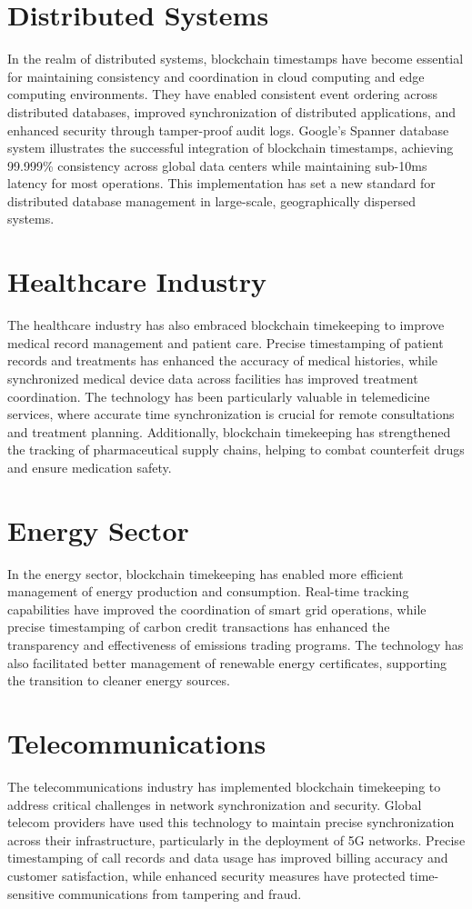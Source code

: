 \documentclass[12pt]{report}
\begin{document}
\section{Distributed Systems}
In the realm of distributed systems, blockchain timestamps have become essential for maintaining consistency and coordination in cloud computing and edge computing environments. They have enabled consistent event ordering across distributed databases, improved synchronization of distributed applications, and enhanced security through tamper-proof audit logs. Google's Spanner database system illustrates the successful integration of blockchain timestamps, achieving 99.999\% consistency across global data centers while maintaining sub-10ms latency for most operations. This implementation has set a new standard for distributed database management in large-scale, geographically dispersed systems.

\section{Healthcare Industry}
The healthcare industry has also embraced blockchain timekeeping to improve medical record management and patient care. Precise timestamping of patient records and treatments has enhanced the accuracy of medical histories, while synchronized medical device data across facilities has improved treatment coordination. The technology has been particularly valuable in telemedicine services, where accurate time synchronization is crucial for remote consultations and treatment planning. Additionally, blockchain timekeeping has strengthened the tracking of pharmaceutical supply chains, helping to combat counterfeit drugs and ensure medication safety.

\section{Energy Sector}
In the energy sector, blockchain timekeeping has enabled more efficient management of energy production and consumption. Real-time tracking capabilities have improved the coordination of smart grid operations, while precise timestamping of carbon credit transactions has enhanced the transparency and effectiveness of emissions trading programs. The technology has also facilitated better management of renewable energy certificates, supporting the transition to cleaner energy sources.

\section{Telecommunications}
The telecommunications industry has implemented blockchain timekeeping to address critical challenges in network synchronization and security. Global telecom providers have used this technology to maintain precise synchronization across their infrastructure, particularly in the deployment of 5G networks. Precise timestamping of call records and data usage has improved billing accuracy and customer satisfaction, while enhanced security measures have protected time-sensitive communications from tampering and fraud.
\end{document}
